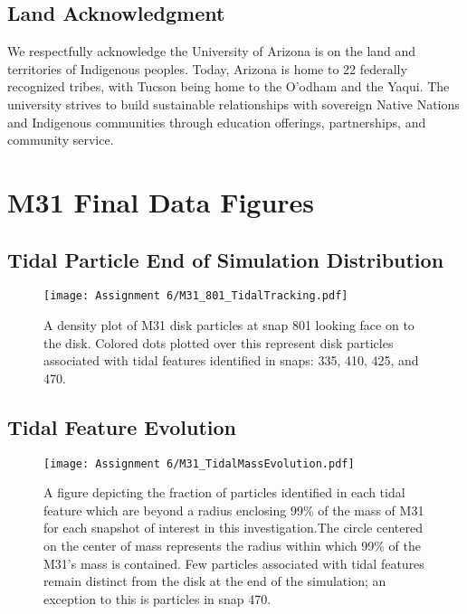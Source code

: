 \documentclass[fleqn,usenatbib]{mnras}
\begin{document}
\subsection*{Land Acknowledgment}
We respectfully acknowledge the University of Arizona is on the land and territories of Indigenous peoples. Today, Arizona is home to 22 federally recognized tribes, with Tucson being home to the O’odham and the Yaqui. The university strives to build sustainable relationships with sovereign Native Nations and Indigenous communities through education offerings, partnerships, and community service.



 


\appendix
\section{M31 Final Data Figures}
\subsection{Tidal Particle End of Simulation Distribution}
\begin{figure}[b!]
	\texttt{[image: Assignment 6/M31\_801\_TidalTracking.pdf]}
    \caption{A density plot of M31 disk particles at snap 801 looking face on to the disk. Colored dots plotted over this represent disk particles associated with tidal features identified in snaps: 335, 410, 425, and 470.}
    \label{fig:M31_EndSim}
\end{figure}

\subsection{Tidal Feature Evolution}
\begin{figure}[b!]
	\texttt{[image: Assignment 6/M31\_TidalMassEvolution.pdf]}
    \caption{A figure depicting the fraction of particles identified in each tidal feature which are beyond a radius enclosing 99\% of the mass of M31 for each snapshot of interest in this investigation.The circle centered on the center of mass represents the radius within which 99\% of the M31's mass is contained. Few particles associated with tidal features remain distinct from the disk at the end of the simulation; an exception to this is particles in snap 470.}
    \label{fig:M31_TidalEvolution}
\end{figure}




\bsp	%
\label{lastpage}
\end{document}
